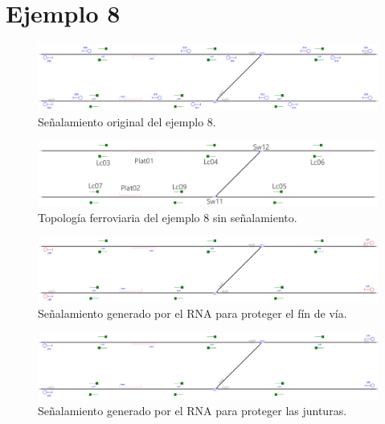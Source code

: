 \section{Ejemplo 8}

    \lipsum[1]

    \begin{figure}[h]
        \centering
        \includegraphics[width=1\textwidth]{resultados-obtenidos/ejemplo8/images/8_original.png}
        \centering\caption{Señalamiento original del ejemplo 8.}
    \end{figure}

    \begin{figure}[h]
        \centering
        \includegraphics[width=1\textwidth]{resultados-obtenidos/ejemplo8/images/8_empty.png}
        \centering\caption{Topología ferroviaria del ejemplo 8 sin señalamiento.}
    \end{figure}

    \begin{figure}[h]
        \centering
        \includegraphics[width=1\textwidth]{resultados-obtenidos/ejemplo8/images/8_step1.png}
        \centering\caption{Señalamiento generado por el RNA para proteger el fín de vía.}
    \end{figure}

    \begin{figure}[h]
        \centering
        \includegraphics[width=1\textwidth]{resultados-obtenidos/ejemplo8/images/8_step2.png}
        \centering\caption{Señalamiento generado por el RNA para proteger las junturas.}
    \end{figure}

